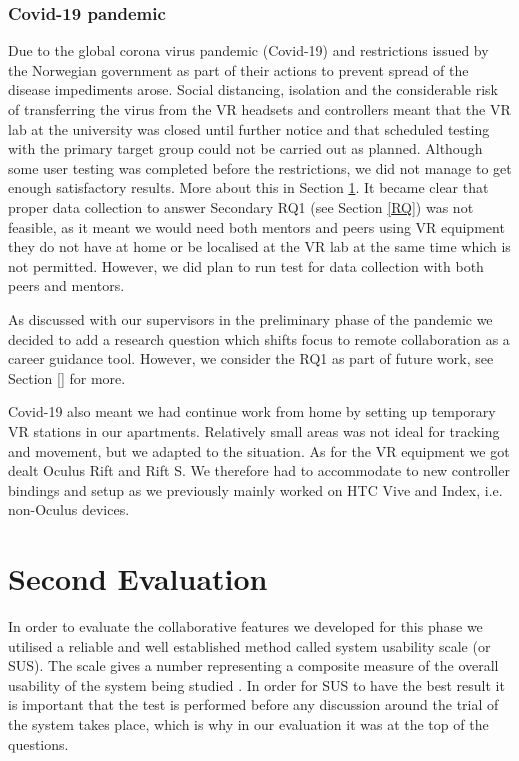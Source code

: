 \subsubsection{Covid-19 pandemic}
\label{section:covid19}
Due to the global corona virus pandemic (Covid-19) and restrictions issued by the Norwegian government as part of their actions to prevent spread of the disease \cite{FhiCorona} impediments arose. Social distancing, isolation and the considerable risk of transferring the virus from the VR headsets and controllers meant that the VR lab at the university was closed until further notice and that scheduled testing with the primary target group could not be carried out as planned. Although some user testing was completed before the restrictions, we did not manage to get enough satisfactory results. More about this in Section \ref{section:secondEvalPhase2}. It became clear that proper data collection to answer Secondary RQ1 (see Section \ref{RQ}) was not feasible, as it meant we would need both mentors and peers using VR equipment they do not have at home or be localised at the VR lab at the same time which is not permitted. However, we did plan to run test for data collection with both peers and mentors. 

As discussed with our supervisors in the preliminary phase of the pandemic we decided to add a research question which shifts focus to remote collaboration as a career guidance tool. However, we consider the RQ1 as part of future work, see Section \ref{} for more. 

Covid-19 also meant we had continue work from home by setting up temporary VR stations in our apartments. Relatively small areas was not ideal for tracking and movement, but we adapted to the situation. As for the VR equipment we got dealt Oculus Rift and Rift S. We therefore had to accommodate to new controller bindings and setup as we previously mainly worked on HTC Vive and Index, i.e. non-Oculus devices.            





\section{Second Evaluation}
\label{section:secondEvalPhase2}

In order to evaluate the collaborative features we developed for this phase we utilised a reliable and well established method called system usability scale (or SUS). The scale gives a number representing a composite measure of the overall usability of the system being studied \cite{brooke1996sus}. In order for SUS to have the best result it is important that the test is performed before any discussion around the trial of the system takes place, which is why in our evaluation it was at the  top of the questions. 


